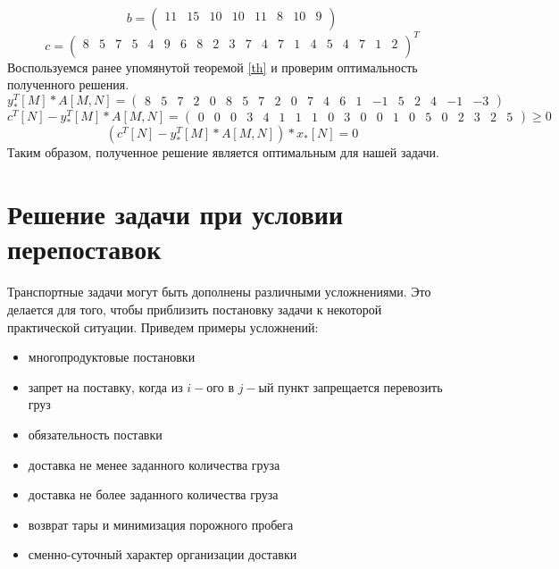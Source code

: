 \documentclass{article}
\begin{document}
\begin{equation*}
    b=
    \begin{pmatrix}
    11 &15 &10 &10 &11 &8 &10 &9 \\
    \end{pmatrix}
\end{equation*}
\begin{equation*}
    c = 
    \begin{pmatrix}
    8& 5& 7& 5& 4& 9& 6 &8 &2& 3&7 &4& 7 &1 &4 &5& 4& 7& 1 &2\\
    \end{pmatrix}^T
\end{equation*}
\noindent Воспользуемся ранее упомянутой теоремой \eqref{th} и проверим оптимальность полученного решения.
\begin{equation*}
    y_\ast^T\left[M\right]\ast A\left[M,N\right]= \begin{pmatrix}
        8 &5 &7 &2 &0& 8& 5& 7& 2& 0& 7& 4& 6& 1& -1& 5& 2& 4& -1& -3
    \end{pmatrix}
\end{equation*}
\begin{equation*}
    c^T\left[N\right]-y_\ast^T\left[M\right]\ast A\left[M,N\right]= \begin{pmatrix}
        0 &0 &0 &3 & 4& 1& 1& 1& 0& 3& 0& 0& 1& 0 &5 & 0 & 2 & 3 & 2 & 5
    \end{pmatrix}
    \geq0
\end{equation*}
\begin{equation*}
    \left(c^T\left[N\right]-y_\ast^T\left[M\right]\ast A\left[M,N\right]\right)\ast x_\ast\left[N\right]=0
\end{equation*}
Таким образом, полученное решение является оптимальным для нашей задачи.

\section{Решение задачи при условии перепоставок}
\noindent Транспортные задачи могут быть дополнены различными усложнениями. Это делается для того, чтобы приблизить постановку задачи к некоторой практической ситуации. Приведем примеры усложнений:
\begin{itemize}
    \item многопродуктовые постановки
    \item запрет на поставку, когда из $i-$ого в $j-$ый пункт запрещается перевозить груз
    \item обязательность поставки
    \item доставка не менее заданного количества груза
    \item доставка не более заданного количества груза
    \item возврат тары и минимизация порожного пробега
    \item сменно-суточный характер организации доставки
\end{itemize}
\end{document}
